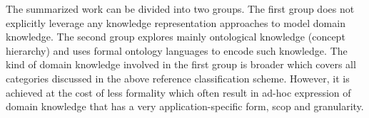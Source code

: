 The summarized work can be divided into two groups. The first group does not explicitly leverage any knowledge representation approaches to model domain knowledge. The second group explores mainly ontological knowledge (concept hierarchy) and uses formal ontology languages to encode such knowledge. The kind of domain knowledge involved in the first group is broader which covers all categories discussed in the above reference classification scheme. However, it is achieved at the cost of less formality which often result in ad-hoc expression of domain knowledge that has a very application-specific form, scop and granularity.




